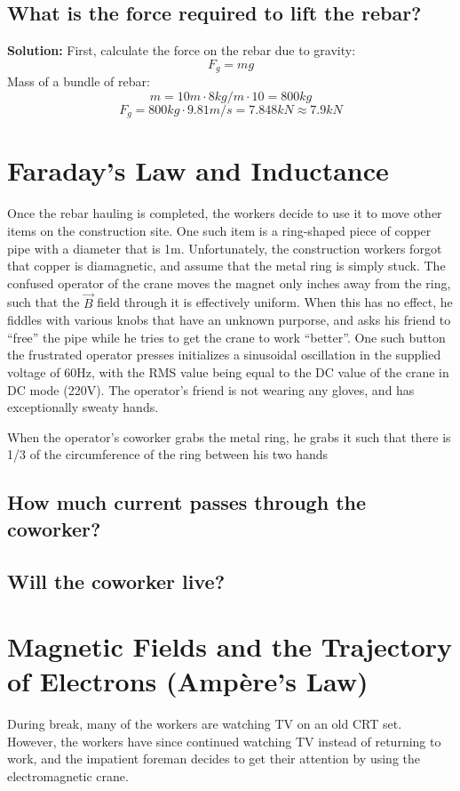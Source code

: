 \documentclass{./cls/hw}
\newcommand{\sol}{\large\textbf{Solution: }\normalsize}
\begin{document}
\subsection{What is the force required to lift the rebar?}

\sol First, calculate the force on the rebar due to
gravity:
  \[  F_g = mg \]
Mass of a bundle of rebar:
  \[  m = 10m \cdot 8kg/m \cdot 10 = 800kg\]
  \[  F_g = 800kg \cdot 9.81 m/s = 7.848kN \approx \boxed{7.9kN}\]
\section{Faraday's Law and Inductance}
Once the rebar hauling is completed, the workers decide to use it to move
other items on the construction site. One such item is a ring-shaped piece of
copper pipe with a diameter that is 1m. Unfortunately, the construction
workers forgot that copper is diamagnetic, and assume that the metal ring is
simply stuck. The  confused operator of the crane moves the magnet only inches
away from the ring, such that the $\vec{B}$ field through it is effectively
uniform. When this has no effect, he fiddles with various knobs that have an
unknown purporse, and asks his friend to ``free'' the pipe while he tries to
get the crane to work
``better''. One such button  the frustrated operator presses initializes a
sinusoidal oscillation in the supplied voltage of 60Hz, with the RMS value
being equal to the DC value of the crane in DC mode (220V). The operator's
friend is not wearing any gloves, and has exceptionally sweaty hands.

When the operator's coworker grabs the metal ring, he grabs it such that there
is 1/3 of the circumference of the ring between his two hands
\subsection{ How much current passes through the coworker?}
\subsection{ Will the coworker live?}

\section{Magnetic Fields and the Trajectory of Electrons (Amp\`ere's Law)}
During break, many of the workers are watching TV on an old CRT set.
However, the workers have since continued watching TV instead of returning to
work, and the impatient foreman decides to get their attention by using the
electromagnetic crane.
\end{document}
